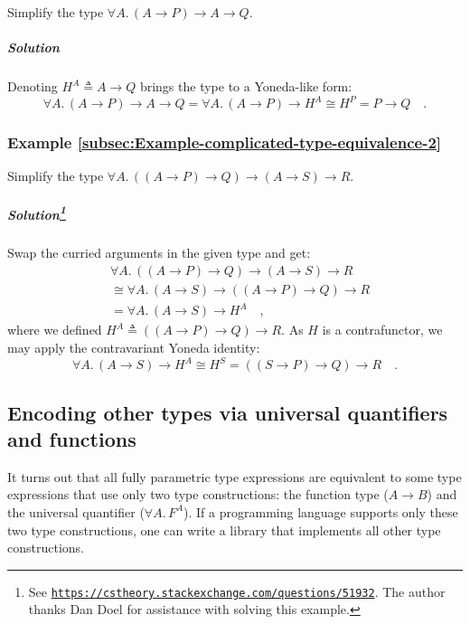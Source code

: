 Simplify the type $\forall A.\,(A\rightarrow P)\rightarrow A\rightarrow Q$.

\subparagraph{Solution}

Denoting $H^{A}\triangleq A\rightarrow Q$ brings the type to a Yoneda-like
form:
\[
\forall A.\,(A\rightarrow P)\rightarrow A\rightarrow Q=\forall A.\,(A\rightarrow P)\rightarrow H^{A}\cong H^{P}=P\rightarrow Q\quad.
\]
 

\subsubsection{Example \label{subsec:Example-complicated-type-equivalence-2}\ref{subsec:Example-complicated-type-equivalence-2}}

Simplify the type $\forall A.\,((A\rightarrow P)\rightarrow Q)\rightarrow(A\rightarrow S)\rightarrow R$.

\subparagraph{Solution\protect\footnote{See \texttt{\protect\href{https://cstheory.stackexchange.com/questions/51932}{https://cstheory.stackexchange.com/questions/51932}}.
The author thanks Dan Doel for assistance with solving
this example.}}

Swap the curried arguments in the given type and get:
\begin{align*}
 & \forall A.\,((A\rightarrow P)\rightarrow Q)\rightarrow(A\rightarrow S)\rightarrow R\\
 & \cong\forall A.\,(A\rightarrow S)\rightarrow((A\rightarrow P)\rightarrow Q)\rightarrow R\\
 & =\forall A.\,(A\rightarrow S)\rightarrow H^{A}\quad,
\end{align*}
where we defined $H^{A}\triangleq((A\rightarrow P)\rightarrow Q)\rightarrow R$.
As $H$ is a contrafunctor, we may apply the contravariant Yoneda
identity:
\[
\forall A.\,(A\rightarrow S)\rightarrow H^{A}\cong H^{S}=((S\rightarrow P)\rightarrow Q)\rightarrow R\quad.
\]


\subsection{Encoding other types via universal quantifiers and functions}

It turns out that all fully parametric type expressions are equivalent
to some type expressions that use only two type constructions: the
function type ($A\rightarrow B$) and the universal quantifier ($\forall A.\,F^{A}$).
If a programming language supports only these two type constructions,
one can write a library that implements all other type constructions.

